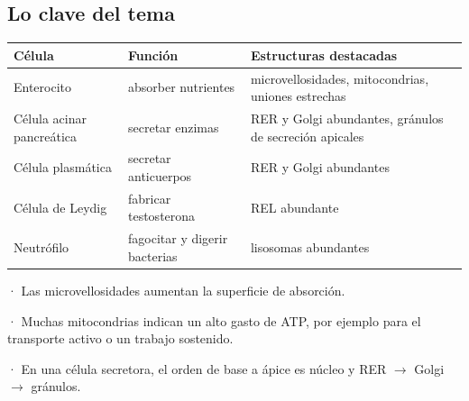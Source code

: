 \subsection{Lo clave del tema}
\begin{center}\small
\begin{tabularx}{\linewidth}{@{}>{\raggedright\arraybackslash\hsize=0.80\hsize}X>{\raggedright\arraybackslash\hsize=0.93\hsize}X>{\raggedright\arraybackslash\hsize=1.28\hsize}X@{}}
\toprule
\textbf{Célula} & \textbf{Función} & \textbf{Estructuras destacadas} \\
\midrule
Enterocito & absorber nutrientes & microvellosidades, mitocondrias, uniones estrechas \\
Célula acinar pancreática & secretar enzimas & RER y Golgi abundantes, gránulos de secreción apicales \\
Célula plasmática & secretar anticuerpos & RER y Golgi abundantes \\
Célula de Leydig & fabricar testosterona & REL abundante \\
Neutrófilo & fagocitar y digerir bacterias & lisosomas abundantes \\
\bottomrule
\end{tabularx}
\end{center}
 
\begin{clave}[{Recuerda}] · Las microvellosidades aumentan la superficie de absorción.\par · Muchas mitocondrias indican un alto gasto de ATP, por ejemplo para el transporte activo o un trabajo sostenido.\par · En una célula secretora, el orden de base a ápice es núcleo y RER \ensuremath{\rightarrow} Golgi \ensuremath{\rightarrow} gránulos.\end{clave}
 
